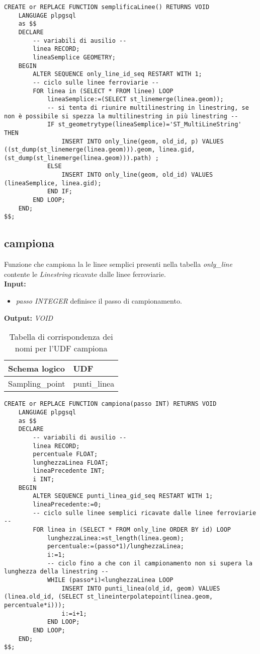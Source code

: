 \begin{lstlisting}[style=mySQL]
CREATE or REPLACE FUNCTION semplificaLinee() RETURNS VOID
	LANGUAGE plpgsql
	as $$
	DECLARE
		-- variabili di ausilio --
		linea RECORD;
		lineaSemplice GEOMETRY;
	BEGIN
		ALTER SEQUENCE only_line_id_seq RESTART WITH 1;
		-- ciclo sulle linee ferroviarie --
		FOR linea in (SELECT * FROM linee) LOOP
			lineaSemplice:=(SELECT st_linemerge(linea.geom));
			-- si tenta di riunire multilinestring in linestring, se non è possibile si spezza la multilinestring in più linestring --
			IF st_geometrytype(lineaSemplice)='ST_MultiLineString' THEN
				INSERT INTO only_line(geom, old_id, p) VALUES ((st_dump(st_linemerge(linea.geom))).geom, linea.gid, (st_dump(st_linemerge(linea.geom))).path) ;
			ELSE
				INSERT INTO only_line(geom, old_id) VALUES (lineaSemplice, linea.gid);
			END IF;
		END LOOP;
	END;
$$;
\end{lstlisting}

\subsection{campiona}
Funzione che campiona la le linee semplici presenti nella tabella \textit{only\_line} contente le \textit{Linestring} ricavate dalle linee ferroviarie.\\
\textbf{Input:} 
\begin{itemize}
\item \textit{passo INTEGER} definisce il passo di campionamento.
\end{itemize}
\textbf{Output:} \textit{VOID} 

\begin{table}[h]
\centering
\caption{Tabella di corrispondenza dei nomi per l'UDF campiona}
\label{mapTb5}
\begin{tabular}{|l|l|}
\hline
Schema logico       & UDF                \\ \hline
Sampling\_point          & punti\_linea              \\ \hline
\end{tabular}
\end{table}

\begin{lstlisting}[style=mySQL]
CREATE or REPLACE FUNCTION campiona(passo INT) RETURNS VOID
	LANGUAGE plpgsql
	as $$
	DECLARE
		-- variabili di ausilio --
		linea RECORD;
		percentuale FLOAT;
		lunghezzaLinea FLOAT;
		lineaPrecedente INT;
		i INT;
	BEGIN
		ALTER SEQUENCE punti_linea_gid_seq RESTART WITH 1;
		lineaPrecedente:=0;
		-- ciclo sulle linee semplici ricavate dalle linee ferroviarie --
		FOR linea in (SELECT * FROM only_line ORDER BY id) LOOP
			lunghezzaLinea:=st_length(linea.geom);
			percentuale:=(passo*1)/lunghezzaLinea;
			i:=1;
			-- ciclo fino a che con il campionamento non si supera la lunghezza della linestring --
			WHILE (passo*i)<lunghezzaLinea LOOP
				INSERT INTO punti_linea(old_id, geom) VALUES (linea.old_id, (SELECT st_lineinterpolatepoint(linea.geom, percentuale*i)));
				i:=i+1;
			END LOOP;
		END LOOP;
	END;
$$;
\end{lstlisting}


